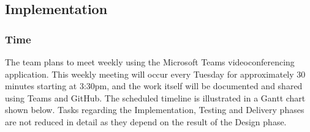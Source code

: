 \clearpage
{}
\addtolength{\hoffset}{-3.0cm}
\recalctypearea
\thispagestyle{empty}
\subsection*{Implementation}
\subsubsection*{Time}
The team plans to meet weekly using the Microsoft Teams videoconferencing application. This weekly meeting will occur every Tuesday for approximately 30 minutes starting at 3:30pm, and the work itself will be documented and shared using Teams and GitHub. The scheduled timeline is illustrated in a Gantt chart shown below. Tasks regarding the Implementation, Testing and Delivery phases are not reduced in detail as they depend on the result of the Design phase. \\

